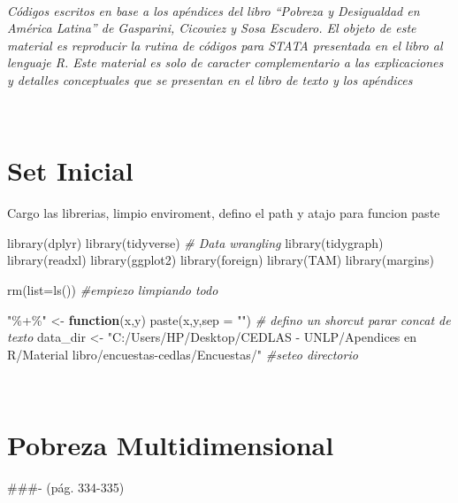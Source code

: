\documentclass[
]{book}
\newenvironment{Shaded}{\begin{snugshade}}{\end{snugshade}}
\newcommand{\AttributeTok}[1]{\textcolor[rgb]{0.77,0.63,0.00}{#1}}
\newcommand{\CommentTok}[1]{\textcolor[rgb]{0.56,0.35,0.01}{\textit{#1}}}
\newcommand{\ControlFlowTok}[1]{\textcolor[rgb]{0.13,0.29,0.53}{\textbf{#1}}}
\newcommand{\FunctionTok}[1]{\textcolor[rgb]{0.00,0.00,0.00}{#1}}
\newcommand{\NormalTok}[1]{#1}
\newcommand{\OtherTok}[1]{\textcolor[rgb]{0.56,0.35,0.01}{#1}}
\newcommand{\StringTok}[1]{\textcolor[rgb]{0.31,0.60,0.02}{#1}}
\begin{document}
~

\emph{Códigos escritos en base a los apéndices del libro ``Pobreza y Desigualdad en América Latina'' de Gasparini, Cicowiez y Sosa Escudero. El objeto de este material es reproducir la rutina de códigos para STATA presentada en el libro al lenguaje R. Este material es solo de caracter complementario a las explicaciones y detalles conceptuales que se presentan en el libro de texto y los apéndices}

~

\hypertarget{set-inicial-3}{%
\section*{Set Inicial}\label{set-inicial-3}}

Cargo las librerias, limpio enviroment, defino el path y atajo para funcion paste

\begin{Shaded}
\begin{Highlighting}[]
\FunctionTok{library}\NormalTok{(dplyr)}
\FunctionTok{library}\NormalTok{(tidyverse) }\CommentTok{\# Data wrangling}
\FunctionTok{library}\NormalTok{(tidygraph)}
\FunctionTok{library}\NormalTok{(readxl)}
\FunctionTok{library}\NormalTok{(ggplot2)}
\FunctionTok{library}\NormalTok{(foreign)}
\FunctionTok{library}\NormalTok{(TAM)}
\FunctionTok{library}\NormalTok{(margins)}

\FunctionTok{rm}\NormalTok{(}\AttributeTok{list=}\FunctionTok{ls}\NormalTok{())    }\CommentTok{\#empiezo limpiando todo }

\StringTok{"\%+\%"} \OtherTok{\textless{}{-}} \ControlFlowTok{function}\NormalTok{(x,y) }\FunctionTok{paste}\NormalTok{(x,y,}\AttributeTok{sep =} \StringTok{""}\NormalTok{)      }\CommentTok{\# defino un shorcut parar concat de texto}
\NormalTok{data\_dir }\OtherTok{\textless{}{-}} \StringTok{"C:/Users/HP/Desktop/CEDLAS {-} UNLP/Apendices en R/Material libro/encuestas{-}cedlas/Encuestas/"}  \CommentTok{\#seteo directorio }
\end{Highlighting}
\end{Shaded}

~

\hypertarget{pobreza-multidimensional}{%
\section{Pobreza Multidimensional}\label{pobreza-multidimensional}}

\#\#\#- (pág. 334-335)
\end{document}
